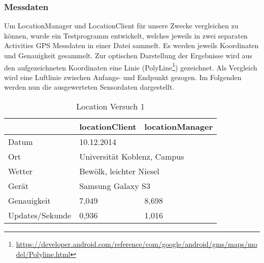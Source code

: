 \subsubsection{Messdaten}

Um LocationManager und LocationClient für unsere Zwecke vergleichen zu können, wurde ein Testprogramm entwickelt, welches jeweils in zwei separaten Activities GPS Messdaten in einer Datei sammelt. Es werden jeweils Koordinaten und Genauigkeit gesammelt. Zur optischen Darstellung der Ergebnisse wird aus den aufgezeichneten Koordinaten eine Linie (PolyLine\footnote{\url{https://developer.android.com/reference/com/google/android/gms/maps/model/Polyline.html}}) gezeichnet. Als Vergleich wird eine Luftlinie zwischen Anfangs- und Endpunkt gezogen. \newline
Im Folgenden werden nun die ausgewerteten Sensordaten dargestellt.

\begin{table}[h]
\caption{Location Versuch 1}
\begin{tabular}{l|l|l|}
\cline{2-3}
                                      & locationClient         & locationManager         \\ \hline
\multicolumn{1}{|l|}{Datum}           & \multicolumn{2}{l|}{10.12.2014}                  \\ \hline
\multicolumn{1}{|l|}{Ort}             & \multicolumn{2}{l|}{Universität Koblenz, Campus} \\ \hline
\multicolumn{1}{|l|}{Wetter}          & \multicolumn{2}{l|}{Bewölk, leichter Niesel}     \\ \hline
\multicolumn{1}{|l|}{Gerät}           & \multicolumn{2}{l|}{Samsung Galaxy S3}           \\ \hline
\multicolumn{1}{|l|}{Genauigkeit}     & 7,049                  & 8,698                   \\ \hline
\multicolumn{1}{|l|}{Updates/Sekunde} & 0,936                  & 1,016                   \\ \hline
\end{tabular}
\label{tab:lV1}
\end{table}

